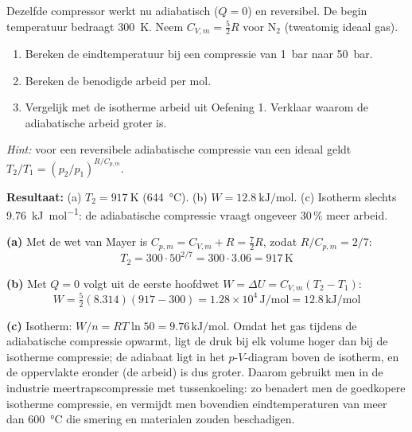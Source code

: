 \begin{oefening}
Dezelfde compressor werkt nu adiabatisch ($Q = 0$) en reversibel. De begin temperatuur bedraagt \SI{300}{\kelvin}. Neem $C_{V,m} = \frac{5}{2}R$ voor $\mathrm{N_2}$ (tweatomig ideaal gas).
\begin{enumerate}
\item[(a)] Bereken de eindtemperatuur bij een compressie van \SI{1}{\bar} naar \SI{50}{\bar}.
\item[(b)] Bereken de benodigde arbeid per mol.
\item[(c)] Vergelijk met de isotherme arbeid uit Oefening 1. Verklaar waarom de adiabatische arbeid groter is.
\end{enumerate}
\emph{Hint:} voor een reversibele adiabatische compressie van een ideaal geldt $T_2/T_1 = (p_2/p_1)^{R/C_{p,m}}$.    
\end{oefening}
\begin{oplossing}
\textbf{Resultaat:} (a) $T_2 = \SI{917}{\kelvin}$ (\SI{644}{\celsius}). (b) $W = \SI{12.8}{\kilo\joule\per\mole}$. (c) Isotherm slechts \SI{9.76}{\kilo\joule\per\mole}: de adiabatische compressie vraagt ongeveer 30\,\% meer arbeid.

\textbf{(a)} Met de wet van Mayer is $C_{p,m} = C_{V,m} + R = \frac{7}{2}R$, zodat $R/C_{p,m} = 2/7$:
\[
T_2 = 300 \cdot 50^{2/7} = 300 \cdot 3.06 = 917\,\mathrm{K}
\]

\textbf{(b)} Met $Q = 0$ volgt uit de eerste hoofdwet $W = \Delta U = C_{V,m}(T_2 - T_1)$:
\[
W = \tfrac{5}{2}(8.314)(917-300) = 1.28\times10^{4}\,\mathrm{J/mol} = 12.8\,\mathrm{kJ/mol}
\]

\textbf{(c)} Isotherm: $W/n = RT\ln 50 = 9.76\,\mathrm{kJ/mol}$. Omdat het gas tijdens de adiabatische compressie opwarmt, ligt de druk bij elk volume hoger dan bij de isotherme compressie; de adiabaat ligt in het $p$-$V$-diagram boven de isotherm, en de oppervlakte eronder (de arbeid) is dus groter. Daarom gebruikt men in de industrie meertrapscompressie met tussenkoeling: zo benadert men de goedkopere isotherme compressie, en vermijdt men bovendien eindtemperaturen van meer dan \SI{600}{\celsius} die smering en materialen zouden beschadigen.
\end{oplossing}

